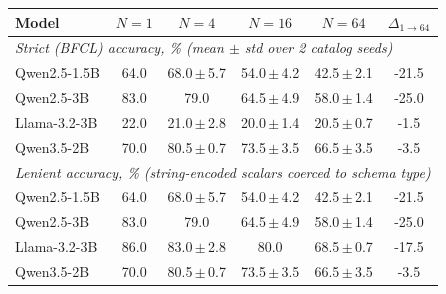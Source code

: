 \begin{tabular}{lccccc}
\toprule
Model & $N{=}1$ & $N{=}4$ & $N{=}16$ & $N{=}64$ & $\Delta_{1\to64}$ \\
\midrule
\multicolumn{6}{l}{\textit{Strict (BFCL) accuracy, \% (mean $\pm$ std over 2 catalog seeds)}} \\
Qwen2.5-1.5B & 64.0 & 68.0\,$\pm$\,5.7 & 54.0\,$\pm$\,4.2 & 42.5\,$\pm$\,2.1 & -21.5 \\
Qwen2.5-3B & 83.0 & 79.0 & 64.5\,$\pm$\,4.9 & 58.0\,$\pm$\,1.4 & -25.0 \\
Llama-3.2-3B & 22.0 & 21.0\,$\pm$\,2.8 & 20.0\,$\pm$\,1.4 & 20.5\,$\pm$\,0.7 & -1.5 \\
Qwen3.5-2B & 70.0 & 80.5\,$\pm$\,0.7 & 73.5\,$\pm$\,3.5 & 66.5\,$\pm$\,3.5 & -3.5 \\
\midrule
\multicolumn{6}{l}{\textit{Lenient accuracy, \% (string-encoded scalars coerced to schema type)}} \\
Qwen2.5-1.5B & 64.0 & 68.0\,$\pm$\,5.7 & 54.0\,$\pm$\,4.2 & 42.5\,$\pm$\,2.1 & -21.5 \\
Qwen2.5-3B & 83.0 & 79.0 & 64.5\,$\pm$\,4.9 & 58.0\,$\pm$\,1.4 & -25.0 \\
Llama-3.2-3B & 86.0 & 83.0\,$\pm$\,2.8 & 80.0 & 68.5\,$\pm$\,0.7 & -17.5 \\
Qwen3.5-2B & 70.0 & 80.5\,$\pm$\,0.7 & 73.5\,$\pm$\,3.5 & 66.5\,$\pm$\,3.5 & -3.5 \\
\bottomrule
\end{tabular}
